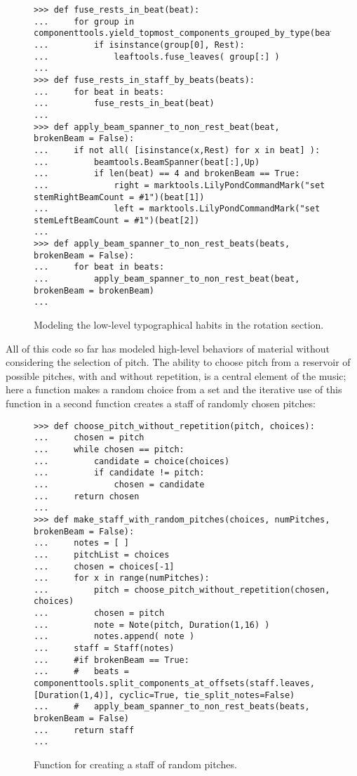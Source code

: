 \begin{figure}[H]
\begin{lstlisting}[basicstyle=\scriptsize\ttfamily, breaklines=True, tabsize=4, showtabs=false, showspaces=false]
>>> def fuse_rests_in_beat(beat):
...     for group in componenttools.yield_topmost_components_grouped_by_type(beat):
...         if isinstance(group[0], Rest):
...             leaftools.fuse_leaves( group[:] )
... 
>>> def fuse_rests_in_staff_by_beats(beats):
...     for beat in beats:
...         fuse_rests_in_beat(beat)
... 
>>> def apply_beam_spanner_to_non_rest_beat(beat, brokenBeam = False):
...     if not all( [isinstance(x,Rest) for x in beat] ):
...         beamtools.BeamSpanner(beat[:],Up)
...         if len(beat) == 4 and brokenBeam == True:
...             right = marktools.LilyPondCommandMark("set stemRightBeamCount = #1")(beat[1])
...             left = marktools.LilyPondCommandMark("set stemLeftBeamCount = #1")(beat[2])
... 
>>> def apply_beam_spanner_to_non_rest_beats(beats, brokenBeam = False):
...     for beat in beats:
...         apply_beam_spanner_to_non_rest_beat(beat, brokenBeam = brokenBeam)
... \end{lstlisting}

\caption{Modeling the low-level typographical habits in the rotation section. } 
\end{figure}

All of this code so far has modeled high-level behaviors of material without considering the selection of pitch. The ability to choose pitch from a reservoir of possible pitches, with and without repetition, is a central element of the music; here a function makes a random choice from a set and the iterative use of this function in a second function creates a staff of randomly chosen pitches:

\begin{figure}[H]
\begin{lstlisting}[basicstyle=\scriptsize\ttfamily, breaklines=True, tabsize=4, showtabs=false, showspaces=false]
>>> def choose_pitch_without_repetition(pitch, choices):
...     chosen = pitch
...     while chosen == pitch:
...         candidate = choice(choices)
...         if candidate != pitch:
...             chosen = candidate
...     return chosen
... 
>>> def make_staff_with_random_pitches(choices, numPitches, brokenBeam = False):
...     notes = [ ]
...     pitchList = choices
...     chosen = choices[-1]
...     for x in range(numPitches):
...         pitch = choose_pitch_without_repetition(chosen, choices)
...         chosen = pitch
...         note = Note(pitch, Duration(1,16) )
...         notes.append( note )
...     staff = Staff(notes)
...     #if brokenBeam == True:
...     #   beats = componenttools.split_components_at_offsets(staff.leaves, [Duration(1,4)], cyclic=True, tie_split_notes=False)
...     #   apply_beam_spanner_to_non_rest_beats(beats, brokenBeam = False)
...     return staff
... \end{lstlisting}

\caption{Function for creating a staff of random pitches. } 
\end{figure}

